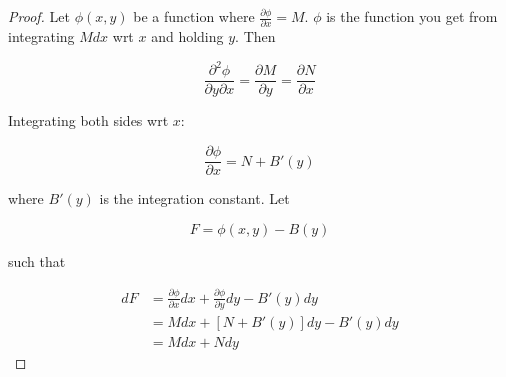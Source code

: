 \begin{proof}
    Let $\phi(x,y)$ be a function where $\frac{\partial \phi}{\partial x}=M$. $\phi$ is the function you get from integrating $Mdx$ wrt $x$ and holding $y$. Then

    \begin{equation}
        \frac{\partial^2\phi}{\partial y\partial x}=\frac{\partial M}{\partial y}=\frac{\partial N}{\partial x}
    \end{equation}

    Integrating both sides wrt $x$:

    \begin{equation}
        \frac{\partial \phi}{\partial x}=N+B'(y)
    \end{equation}

    where $B'(y)$ is the integration constant. Let

    \begin{equation}
        F=\phi(x,y)-B(y)
    \end{equation}

    such that 

    \begin{align}
        dF&=\frac{\partial \phi}{\partial x}dx+\frac{\partial \phi}{\partial y}dy-B'(y)dy\\
        &=Mdx+\left[N+B'(y)\right]dy-B'(y)dy\\
        &=Mdx+Ndy
    \end{align}
\end{proof}

